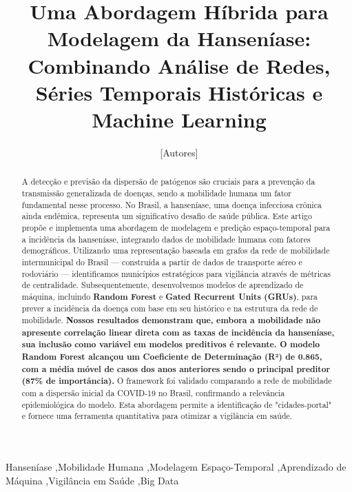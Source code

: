 \documentclass[preprint,12pt]{elsarticle}
\begin{document}
\begin{frontmatter}

\title{Uma Abordagem Híbrida para Modelagem da Hanseníase: Combinando Análise de Redes, Séries Temporais Históricas e Machine Learning}

\author[inst1,inst2]{[Autores]} %



\begin{abstract}
A detecção e previsão da dispersão de patógenos são cruciais para a prevenção da transmissão generalizada de doenças, sendo a mobilidade humana um fator fundamental nesse processo. No Brasil, a hanseníase, uma doença infecciosa crônica ainda endêmica, representa um significativo desafio de saúde pública. Este artigo propõe e implementa uma abordagem de modelagem e predição espaço-temporal para a incidência da hanseníase, integrando dados de mobilidade humana com fatores demográficos. Utilizando uma representação baseada em grafos da rede de mobilidade intermunicipal do Brasil — construída a partir de dados de transporte aéreo e rodoviário — identificamos municípios estratégicos para vigilância através de métricas de centralidade. Subsequentemente, desenvolvemos modelos de aprendizado de máquina, incluindo \textbf{Random Forest} e \textbf{Gated Recurrent Units (GRUs)}, para prever a incidência da doença com base em seu histórico e na estrutura da rede de mobilidade. \textbf{Nossos resultados demonstram que, embora a mobilidade não apresente correlação linear direta com as taxas de incidência da hanseníase, sua inclusão como variável em modelos preditivos é relevante. O modelo Random Forest alcançou um Coeficiente de Determinação (R²) de 0.865, com a média móvel de casos dos anos anteriores sendo o principal preditor (87\% de importância).} O framework foi validado comparando a rede de mobilidade com a dispersão inicial da COVID-19 no Brasil, confirmando a relevância epidemiológica do modelo. Esta abordagem permite a identificação de "cidades-portal" e fornece uma ferramenta quantitativa para otimizar a vigilância em saúde.
\end{abstract}

\begin{keyword}
Hanseníase \sep Mobilidade Humana \sep Modelagem Espaço-Temporal \sep Aprendizado de Máquina \sep Vigilância em Saúde \sep Big Data
\end{keyword}

\end{frontmatter}
\end{document}
